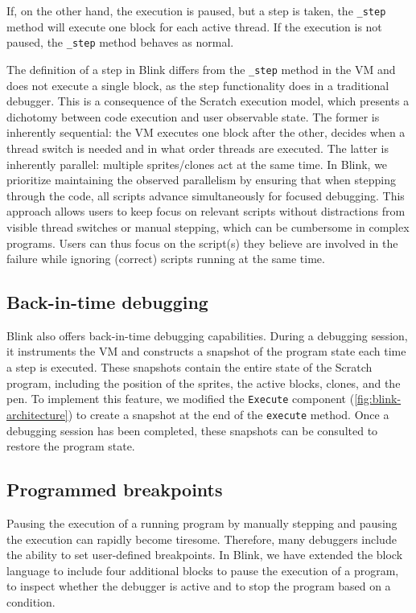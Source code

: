 \documentclass[../main]{subfiles}
\begin{document}
If, on the other hand, the execution is paused, but a step is taken, the \texttt{\_step} method will execute one block for each active thread.
If the execution is not paused, the \texttt{\_step} method behaves as normal.

The definition of a step in Blink differs from the \texttt{\_step} method in the VM and does not execute a single block, as the step functionality does in a traditional debugger.
This is a consequence of the Scratch execution model, which presents a dichotomy between code execution and user observable state.
The former is inherently sequential: the VM executes one block after the other, decides when a thread switch is needed and in what order threads are executed.
The latter is inherently parallel: multiple sprites/clones act at the same time.
In Blink, we prioritize maintaining the observed parallelism by ensuring that when stepping through the code, all scripts advance simultaneously for focused debugging.
This approach allows users to keep focus on relevant scripts without distractions from visible thread switches or manual stepping, which can be cumbersome in complex programs.
Users can thus focus on the script(s) they believe are involved in the failure while ignoring (correct) scripts running at the same time.

\subsection{Back-in-time debugging}\label{subsec:arch-back-in-time-debugging}
Blink also offers back-in-time debugging capabilities.
During a debugging session, it instruments the VM and constructs a snapshot of the program state each time a step is executed.
These snapshots contain the entire state of the Scratch program, including the position of the sprites, the active blocks, clones, and the pen.
To implement this feature, we modified the \texttt{Execute} component (\cref{fig:blink-architecture}) to create a snapshot at the end of the \texttt{execute} method.
Once a debugging session has been completed, these snapshots can be consulted to restore the program state.

\subsection{Programmed breakpoints}\label{subsec:arch-programmed-breakpoints}
Pausing the execution of a running program by manually stepping and pausing the execution can rapidly become tiresome.
Therefore, many debuggers include the ability to set user-defined breakpoints.
In Blink, we have extended the block language to include four additional blocks to pause the execution of a program, to inspect whether the debugger is active and to stop the program based on a condition.
\end{document}
